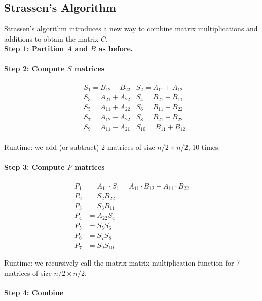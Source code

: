 \documentclass[11  pt]{article}
\begin{document}
\newpage

\subsection{Strassen's Algorithm}
Strassen's algorithm introduces a new way to combine matrix multiplications and additions to obtain the matrix $C$.\\

\textbf{Step 1: Partition $A$ and $B$ as before.}

\vs{3cm}


\paragraph{Step 2: Compute $S$ matrices}
\begin{align*}
&S_1 = B_{12} - B_{22} & S_2 = A_{11} + A_{12} \\
&S_3 = A_{21} + A_{22} & S_4 = B_{21} - B_{11} \\
&S_5 = A_{11} + A_{22} & S_6 = B_{11} + B_{22} \\
&S_7 = A_{12} - A_{22} & S_8 = B_{21} + B_{22} \\
&S_9 = A_{11} - A_{21} & S_{10} = B_{11} + B_{12} \\
\end{align*}

Runtime: we add (or subtract) 2 matrices of size $n/2 \times n/2$, 10 times.


\paragraph{Step 3: Compute $P$ matrices}
\begin{align*}
P_1 &= A_{11} \cdot S_1 = A_{11}\cdot B_{12} - A_{11} \cdot B_{22} \\
P_2 &= S_2 B_{22} \\
P_3 &= S_3 B_{11} \\
P_4 &= A_{22} S_4 \\
P_5 &= S_5 S_6 \\
P_6 &= S_7 S_8 \\
P_7 &= S_9 S_{10}
\end{align*}

Runtime: we recursively call the matrix-matrix multiplication function for 7 matrices of size $n/2 \times n/2$.
\newpage

\paragraph{Step 4: Combine}
\end{document}
